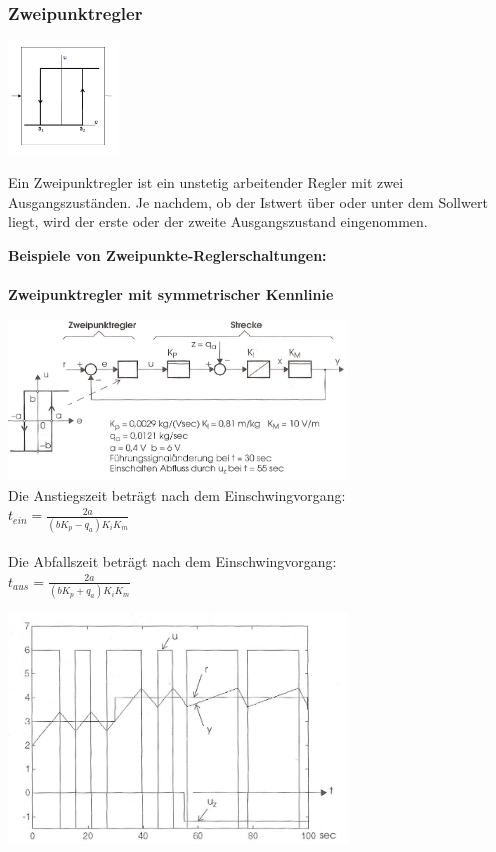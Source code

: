 	\subsubsection{Zweipunktregler}
		\begin{minipage}{3cm}
 		\includegraphics[height=3cm]{./bilder/Zweipunkteregler.png}
        \end{minipage}
		\begin{minipage}{15cm}
        Ein Zweipunktregler ist ein unstetig arbeitender Regler mit zwei
        Ausgangszuständen. Je nachdem, ob der Istwert über oder unter dem
        Sollwert liegt, wird der erste oder der zweite Ausgangszustand
        eingenommen. 
        \end{minipage}
	\textbf{Beispiele von Zweipunkte-Reglerschaltungen:}\\ \\
		\textbf{Zweipunktregler mit symmetrischer Kennlinie } \\
		\begin{minipage}{9cm}
			\vspace{.5cm}        
	 		\includegraphics[width=9cm]{./bilder/Zweipunktregler-b+b2.jpg}\\
			Die Anstiegszeit beträgt nach dem Einschwingvorgang:\\
			$t_{ein}=\frac{2a}{(b K_p - q_a)K_i K_m}$ \\ \\
			Die Abfallszeit beträgt nach dem Einschwingvorgang:\\
			$t_{aus}=\frac{2a}{(b K_p + q_a)K_i K_m}$
        \end{minipage}
		\begin{minipage}{9cm}
			\vspace{.5cm}        
			\includegraphics[width=9cm]{./bilder/Zweipunktregler-b+b_dia.jpg}
        \end{minipage}\\
